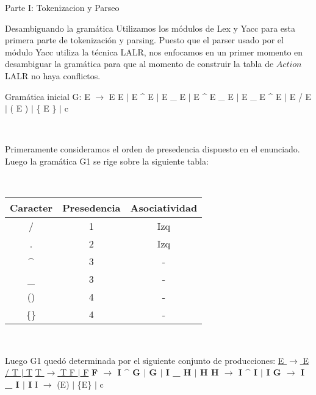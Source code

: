 \begin{section}{Parte I: Tokenizacion y Parseo}

\begin{subsection}{Desambiguando la gram\'atica}
Utilizamos los m\'odulos de Lex y Yacc para esta primera parte de tokenizaci\'on y parsing. Puesto que el parser usado por el m\'odulo Yacc utiliza la t\'ecnica LALR, nos enfocamos en un primer momento en desambiguar la gram\'atica para que al momento de construir la tabla de $Action$ LALR no haya conflictos.

Gram\'atica inicial G:
\newline E $\rightarrow$ E E 
\newline $|$ E \^{} E
\newline $|$ E \_ E
\newline $|$ E \^{} E \_ E
\newline $|$ E \_ E \^{} E
\newline $|$ E / E
\newline $|$ ( E )
\newline $|$ \{ E \}
\newline $|$ c
  
~

Primeramente consideramos el orden de presedencia dispuesto en el enunciado. Luego la gram\'atica G1 se rige sobre la siguiente tabla: 
  
~

\begin{tabular}{ c | c | c }
  			
  Caracter & Presedencia & Asociatividad \\
  \hline
  / & 1 & Izq \\
  . & 2 & Izq \\
  \^{} & 3 & - \\
  \_ & 3 & - \\
  () & 4 & - \\
  \{\} & 4 & - \\
  
\end{tabular}
  
~

Luego G1 qued\'o determinada por el siguiente conjunto de producciones:
\newline \underline{E $\rightarrow$ E / T $|$ T}
\newline \underline{T $\rightarrow$ T F $|$ F}
\textbf{\newline F $\rightarrow$ I \^{} G $|$ G $|$ I \_ H $|$ H
\newline H $\rightarrow$ I \^{} I $|$ I
\newline G $\rightarrow$ I \_ I $|$ I}
\newline I $\rightarrow$ (E) $|$ \{E\} $|$ c
  

\end{subsection}
\end{section}
